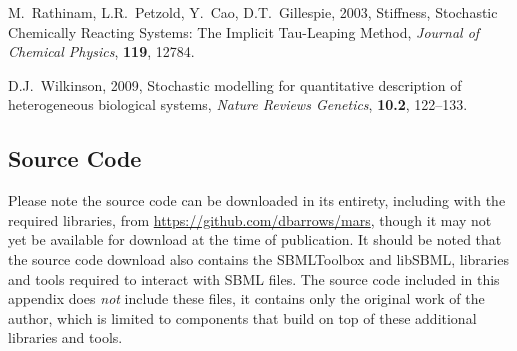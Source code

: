 \documentclass[ugrad,lot,lof,openright,11pt,oneside,onehalfspace]{RUthesis}
\begin{document}
\begin{thebibliography}{99}
	M.~Rathinam, L.R.~Petzold, Y.~Cao, D.T.~Gillespie, 2003, Stiffness, Stochastic Chemically Reacting Systems: The Implicit Tau-Leaping Method, {\it Journal of Chemical Physics}, {\bf 119}, 12784.

	D.J.~Wilkinson, 2009, Stochastic modelling for quantitative description of heterogeneous biological systems, {\it Nature Reviews Genetics}, {\bf 10.2}, 122--133.

\end{thebibliography}

\begin{appendices}

	\chapter{Source Code}

	Please note the source code can be downloaded in its entirety, including with the required libraries, from \url{https://github.com/dbarrows/mars}, though it may not yet be available for download at the time of publication. It should be noted that the source code download also contains the SBMLToolbox and libSBML, libraries and tools required to interact with SBML files. The source code included in this appendix does \textit{not} include these files, it contains only the original work of the author, which is limited to components that build on top of these additional libraries and tools.

	

\end{appendices}
\end{document}
